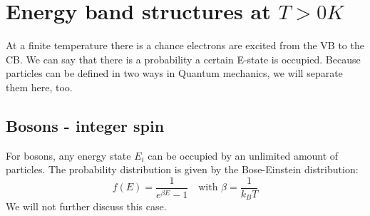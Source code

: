 \section{Energy band structures at $T > 0K$}
At a finite temperature there is a chance electrons are excited from the VB to the CB. We can say that there is a probability a certain E-state is occupied. Because particles can be defined in two ways in Quantum mechanics, we will separate them here, too.

\subsection{Bosons - integer spin}
For bosons, any energy state $E_i$ can be occupied by an unlimited amount of particles. The probability distribution is given by the Bose-Einstein distribution:
\begin{equation}
	f(E) = \frac{1}{e^{\beta E} - 1} \quad \text{with } \beta = \frac{1}{k_BT}
\end{equation}
We will not further discuss this case.

